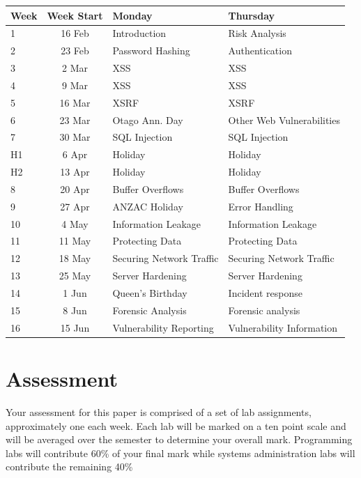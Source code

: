 \documentclass{article}
\begin{document}
\renewcommand{\arraystretch}{1.5}
\begin{tabular}{|l|c|l|l|}
\hline
 Week & Week Start & Monday             & Thursday         \\ \hline
 1    & 16 Feb     & Introduction       & Risk Analysis    \\ \hline
 2    & 23 Feb     & Password Hashing   & Authentication   \\ \hline
 3    &  2 Mar     & XSS                & XSS        \\ \hline
 4    &  9 Mar     & XSS                & XSS     \\ \hline
 5    & 16 Mar     & XSRF               & XSRF     \\ \hline
 6    & 23 Mar     & Otago Ann. Day     & Other Web Vulnerabilities       \\ \hline
 7    & 30 Mar     & SQL Injection      & SQL Injection       \\ \hline
 H1   &  6 Apr     & Holiday            & Holiday \\ \hline
 H2   & 13 Apr     & Holiday            & Holiday \\ \hline
 8    & 20 Apr     & Buffer Overflows   & Buffer Overflows        \\ \hline
 9    & 27 Apr     & ANZAC Holiday      & Error Handling         \\ \hline
 10   &  4 May     & Information Leakage & Information Leakage          \\ \hline
 11   & 11 May     & Protecting Data     &  Protecting Data      \\ \hline
 12   & 18 May     & Securing Network Traffic  & Securing Network Traffic      \\ \hline
 13   & 25 May     & Server Hardening   &  Server Hardening      \\ \hline
 14   &  1 Jun     & Queen's Birthday   &  Incident response  \\ \hline
 15   &  8 Jun     & Forensic Analysis  &  Forensic analysis  \\ \hline
 16   & 15 Jun     & Vulnerability Reporting & Vulnerability Information \\ \hline
\end{tabular}

\newpage 

\section*{Assessment}
Your assessment for this paper is comprised of a set of lab assignments, approximately one each week.  Each lab will be 
marked on a ten point scale and will be averaged over the semester to determine your overall mark.  Programming labs
will contribute 60\% of your final mark while systems administration labs will contribute the remaining 40\%
\end{document}
